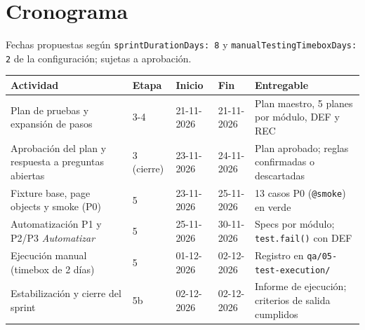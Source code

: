 \documentclass[11pt,a4paper]{article}
\begin{document}
\section{Cronograma}

Fechas propuestas según \texttt{sprintDurationDays: 8} y \texttt{manualTestingTimeboxDays: 2} de la
configuración; sujetas a aprobación.

\begin{center}
\end{center}

\begin{table}[H]
\centering\small
\begin{tabularx}{\textwidth}{@{}X l l l X@{}}
\toprule
Actividad & Etapa & Inicio & Fin & Entregable \\
\midrule
Plan de pruebas y expansión de pasos & 3-4 & 21-11-2026 & 21-11-2026 & Plan maestro, 5 planes por módulo, DEF y REC \\
Aprobación del plan y respuesta a preguntas abiertas & 3 (cierre) & 23-11-2026 & 24-11-2026 & Plan aprobado; reglas confirmadas o descartadas \\
Fixture base, page objects y smoke (P0) & 5 & 23-11-2026 & 25-11-2026 & 13 casos P0 (\texttt{@smoke}) en verde \\
Automatización P1 y P2/P3 \textit{Automatizar} & 5 & 25-11-2026 & 30-11-2026 & Specs por módulo; \texttt{test.fail()} con DEF \\
Ejecución manual (timebox de 2 días) & 5 & 01-12-2026 & 02-12-2026 & Registro en \texttt{qa/05-test-execution/} \\
Estabilización y cierre del sprint & 5b & 02-12-2026 & 02-12-2026 & Informe de ejecución; criterios de salida cumplidos \\
\bottomrule
\end{tabularx}
\end{table}
\end{document}
